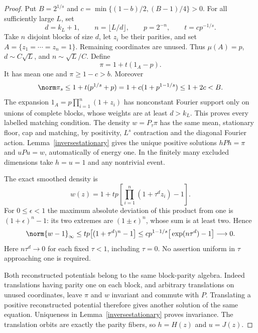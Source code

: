 \begin{proof}
Put $B=2^{1/s}$ and $c=\min\{(1-b)/2,(B-1)/4\}>0$.
For all sufficiently large $L$, set
\[
 d=k_L+1,\qquad n=\lfloor L/d\rfloor,\qquad p=2^{-n},
 \qquad t=cp^{-1/s}.
\]
Take $n$ disjoint blocks of size $d$, let $z_i$ be their parities,
and set $A=\{z_1=\cdots=z_n=1\}$. Remaining coordinates are unused.
Thus $\mu(A)=p$, $d\sim C\sqrt L$, and $n\sim\sqrt L/C$.
Define
\[
 \pi=1+t(1_A-p).
\]
It has mean one and $\pi\geq1-c>b$. Moreover
\[
 \norm\pi_s\leq1+t(p^{1/s}+p)
       =1+c(1+p^{1-1/s})\leq1+2c<B.
\]
The expansion $1_A=p\prod_{i=1}^n(1+z_i)$ has nonconstant Fourier
support only on unions of complete blocks, whose weights are at least
$d>k_L$. This proves every labelled matching condition. The density
$w=P_\tau\pi$ has the same mean, stationary floor, cap and matching,
by positivity, $L^s$ contraction and the diagonal Fourier action.
Lemma~\ref{inversestationary} gives the unique positive solutions
$hPh=\pi$ and $uPu=w$, automatically of energy one. In the finitely
many excluded dimensions take $h=u=1$ and any nontrivial event.

The exact smoothed density is
\[
 w(z)=1+tp\left[\prod_{i=1}^n(1+\tau^d z_i)-1\right].
\]
For $0\leq\epsilon<1$ the maximum absolute deviation of this product
from one is $(1+\epsilon)^n-1$: its two extremes are
$(1\pm\epsilon)^n$, whose sum is at least two. Hence
\[
 \norm{w-1}_\infty
 \leq tp\big[(1+\tau^d)^n-1\big]
 \leq cp^{1-1/s}\big[\exp(n\tau^d)-1\big]\longrightarrow0.
\]
Here $n\tau^d\to0$ for each fixed $\tau<1$, including $\tau=0$.
No assertion uniform in $\tau$ approaching one is required.

Both reconstructed potentials belong to the same block-parity algebra.
Indeed translations having parity one on each block, and arbitrary
translations on unused coordinates, leave $\pi$ and $w$ invariant and
commute with $P$. Translating a positive reconstructed potential therefore
gives another solution of the same equation. Uniqueness in
Lemma~\ref{inversestationary} proves invariance. The translation orbits
are exactly the parity fibers, so $h=H(z)$ and $u=J(z)$.


\end{proof}
